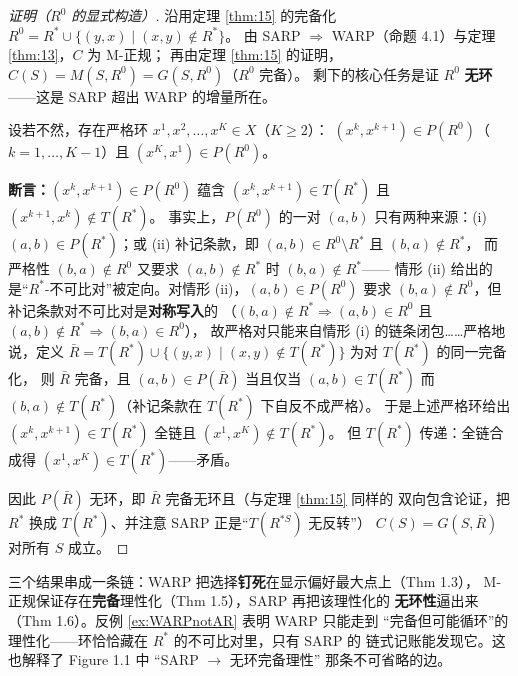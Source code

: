 \begin{proof}[证明（$R^0$ 的显式构造）]
沿用定理 \ref{thm:15} 的完备化 $R^0=R^*\cup\{(y,x)\mid(x,y)\notin R^*\}$。
由 SARP $\Rightarrow$ WARP（命题 4.1）与定理 \ref{thm:13}，$C$ 为 M-正规；
再由定理 \ref{thm:15} 的证明，$C(S)=M(S,R^0)=G(S,R^0)$（$R^0$ 完备）。
剩下的核心任务是证 $R^0$ \textbf{无环}——这是 SARP 超出 WARP 的增量所在。

设若不然，存在严格环 $x^1,x^2,\dots,x^K\in X$（$K\ge 2$）：
$(x^k,x^{k+1})\in P(R^0)$（$k=1,\dots,K-1$）且 $(x^K,x^1)\in P(R^0)$。

\textbf{断言：}$(x^k,x^{k+1})\in P(R^0)$ 蕴含 $(x^k,x^{k+1})\in T(R^*)$ 且
$(x^{k+1},x^k)\notin T(R^*)$。
事实上，$P(R^0)$ 的一对 $(a,b)$ 只有两种来源：(i) $(a,b)\in P(R^*)$；或
(ii) 补记条款，即 $(a,b)\in R^0\setminus R^*$ 且 $(b,a)\notin R^*$，
而严格性 $(b,a)\notin R^0$ 又要求 $(a,b)\notin R^*$ 时 $(b,a)\notin R^*$——
情形 (ii) 给出的是“$R^*$-不可比对”被定向。对情形 (ii)，$(a,b)\in P(R^0)$
要求 $(b,a)\notin R^0$，但补记条款对不可比对是\textbf{对称写入}的
（$(b,a)\notin R^*\Rightarrow(a,b)\in R^0$ 且 $(a,b)\notin R^*\Rightarrow(b,a)\in R^0$），
故严格对只能来自情形 (i) 的链条闭包……严格地说，定义
$\bar R = T(R^*)\cup\{(y,x)\mid (x,y)\notin T(R^*)\}$ 为对 $T(R^*)$ 的同一完备化，
则 $\bar R$ 完备，且 $(a,b)\in P(\bar R)$ 当且仅当 $(a,b)\in T(R^*)$ 而
$(b,a)\notin T(R^*)$（补记条款在 $T(R^*)$ 下自反不成严格）。
于是上述严格环给出 $(x^k,x^{k+1})\in T(R^*)$ 全链且 $(x^1,x^K)\notin T(R^*)$。
但 $T(R^*)$ 传递：全链合成得 $(x^1,x^K)\in T(R^*)$——矛盾。

因此 $P(\bar R)$ 无环，即 $\bar R$ 完备无环且（与定理 \ref{thm:15} 同样的
双向包含论证，把 $R^*$ 换成 $T(R^*)$、并注意 SARP 正是“$T(R^{*S})$ 无反转”）
$C(S)=G(S,\bar R)$ 对所有 $S$ 成立。
\end{proof}

\begin{remark}[三个证明的方法论读法]
三个结果串成一条链：WARP 把选择\textbf{钉死}在显示偏好最大点上（Thm 1.3），
M-正规保证存在\textbf{完备}理性化（Thm 1.5），SARP 再把该理性化的
\textbf{无环性}逼出来（Thm 1.6）。反例 \ref{ex:WARPnotAR} 表明 WARP 只能走到
“完备但可能循环”的理性化——环恰恰藏在 $R^*$ 的不可比对里，只有 SARP 的
链式记账能发现它。这也解释了 Figure 1.1 中 “SARP $\to$ 无环完备理性”
那条不可省略的边。
\end{remark}

